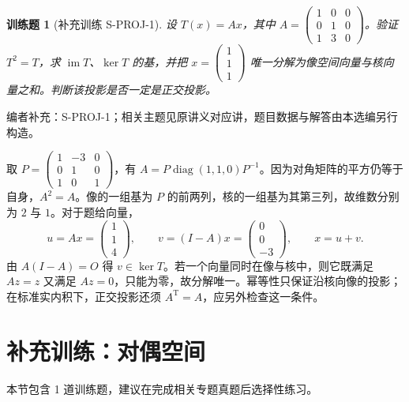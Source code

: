 \documentclass[12pt,fontset=fandol]{ctexart}
\newtheorem{exercise}{训练题}[section]
\begin{document}
\begin{exercise}[补充训练 S-PROJ-1]\label{prob:S-PROJ-1}
设 $T(x)=Ax$，其中 $A=\begin{pmatrix}1&0&0\\0&1&0\\1&3&0\end{pmatrix}$。验证 $T^2=T$，求 $\operatorname{im} T$、$\ker T$ 的基，并把 $x=\begin{pmatrix}1\\1\\1\end{pmatrix}$ 唯一分解为像空间向量与核向量之和。判断该投影是否一定是正交投影。
\end{exercise}
\noindent 编者补充：S-PROJ-1；相关主题见原讲义对应讲，题目数据与解答由本选编另行构造。
\begin{solve}
取 $P=\begin{pmatrix}1&-3&0\\0&1&0\\1&0&1\end{pmatrix}$，有 $A=P\operatorname{diag}(1,1,0)P^{-1}$。因为对角矩阵的平方仍等于自身，$A^2=A$。像的一组基为 $P$ 的前两列，核的一组基为其第三列，故维数分别为 $2$ 与 $1$。对于题给向量，
\[u=Ax=\begin{pmatrix}1\\1\\4\end{pmatrix},\qquad v=(I-A)x=\begin{pmatrix}0\\0\\-3\end{pmatrix},\qquad x=u+v.\]
由 $A(I-A)=O$ 得 $v\in\ker T$。若一个向量同时在像与核中，则它既满足 $Az=z$ 又满足 $Az=0$，只能为零，故分解唯一。幂等性只保证沿核向像的投影；在标准实内积下，正交投影还须 $A^{\mathrm T}=A$，应另外检查这一条件。
\end{solve}

\section{补充训练：对偶空间}

本节包含 1 道训练题，建议在完成相关专题真题后选择性练习。
\end{document}
